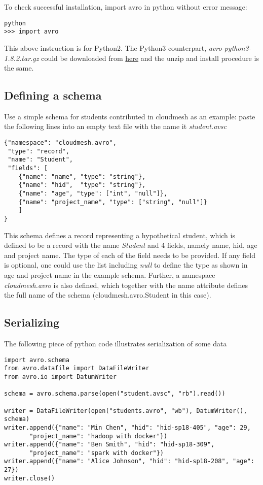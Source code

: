 To check successful installation, import avro in python without error
message:

\begin{lstlisting}
python
>>> import avro
\end{lstlisting}

This above instruction is for Python2. The Python3 counterpart,
\emph{avro-python3-1.8.2.tar.gz} could be downloaded from
\href{http://mirrors.sonic.net/apache/avro/avro-1.8.2/py3/}{here} and
the unzip and install procedure is the same.

\subsection{Defining a schema}

Use a simple schema for students contributed in cloudmesh as an example:
paste the following lines into an empty text file with the name it
\emph{student.avsc}

\begin{lstlisting}
{"namespace": "cloudmesh.avro",
 "type": "record",
 "name": "Student",
 "fields": [
    {"name": "name", "type": "string"},
    {"name": "hid",  "type": "string"},
    {"name": "age", "type": ["int", "null"]},
    {"name": "project_name", "type": ["string", "null"]}
    ]
}
\end{lstlisting}

This schema defines a record representing a hypothetical student, which
is defined to be a record with the name \emph{Student} and 4 fields,
namely name, hid, age and project name. The type of each of the field
needs to be provided. If any field is optional, one could use the list
including \emph{null} to define the type as shown in age and project
name in the example schema. Further, a namespace \emph{cloudmesh.avro}
is also defined, which together with the name attribute defines the full
name of the schema (cloudmesh.avro.Student in this case).

\subsection{Serializing}

The following piece of python code illustrates serialization of some
data

\begin{lstlisting}
import avro.schema
from avro.datafile import DataFileWriter
from avro.io import DatumWriter

schema = avro.schema.parse(open("student.avsc", "rb").read())

writer = DataFileWriter(open("students.avro", "wb"), DatumWriter(), schema)
writer.append({"name": "Min Chen", "hid": "hid-sp18-405", "age": 29,
       "project_name": "hadoop with docker"})
writer.append({"name": "Ben Smith", "hid": "hid-sp18-309",
       "project_name": "spark with docker"})
writer.append({"name": "Alice Johnson", "hid": "hid-sp18-208", "age": 27})
writer.close()
\end{lstlisting}

